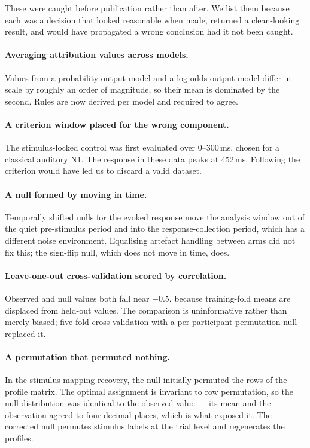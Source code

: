 These were caught before publication rather than after. We list them because each was
a decision that looked reasonable when made, returned a clean-looking result, and would
have propagated a wrong conclusion had it not been caught.

\paragraph{Averaging attribution values across models.}
Values from a probability-output model and a log-odds-output model differ in scale by
roughly an order of magnitude, so their mean is dominated by the second. Rules are now
derived per model and required to agree.

\paragraph{A criterion window placed for the wrong component.}
The stimulus-locked control was first evaluated over 0--300\,ms, chosen for a classical
auditory N1. The response in these data peaks at 452\,ms. Following the criterion would
have led us to discard a valid dataset.

\paragraph{A null formed by moving in time.}
Temporally shifted nulls for the evoked response move the analysis window out of the
quiet pre-stimulus period and into the response-collection period, which has a
different noise environment. Equalising artefact handling between arms did not fix
this; the sign-flip null, which does not move in time, does.

\paragraph{Leave-one-out cross-validation scored by correlation.}
Observed and null values both fall near $-0.5$, because training-fold means are
displaced from held-out values. The comparison is uninformative rather than merely
biased; five-fold cross-validation with a per-participant permutation null replaced it.

\paragraph{A permutation that permuted nothing.}
In the stimulus-mapping recovery, the null initially permuted the rows of the profile
matrix. The optimal assignment is invariant to row permutation, so the null
distribution was identical to the observed value --- its mean and the observation
agreed to four decimal places, which is what exposed it. The corrected null permutes
stimulus labels at the trial level and regenerates the profiles.

